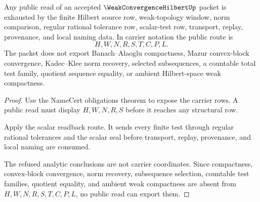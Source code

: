 \begin{theorem}
\label{thm:weak-convergence-hilbert-finite-window-nonescape}
Any public read of an accepted $\WeakConvergenceHilbertUp$ packet is exhausted by the finite Hilbert source row, weak-topology window, norm comparison, regular rational tolerance row, scalar-test row, transport, replay, provenance, and local naming data. In carrier notation the public route is
$$
H,W,N,R,S,T,C,P,L .
$$
The packet does not export Banach--Alaoglu compactness, Mazur convex-block convergence, Kadec--Klee norm recovery, selected subsequences, a countable total test family, quotient sequence equality, or ambient Hilbert-space weak compactness.
\end{theorem}
\begin{proof}
Use the NameCert obligations theorem to expose the carrier rows. A public read must display $H,W,N,R,S$ before it reaches any structural row.

Apply the scalar readback route. It sends every finite test through regular rational tolerances and the scalar seal before transport, replay, provenance, and local naming are consumed.

The refused analytic conclusions are not carrier coordinates. Since compactness, convex-block convergence, norm recovery, subsequence selection, countable test families, quotient equality, and ambient weak compactness are absent from $H,W,N,R,S,T,C,P,L$, no public read can export them.
\end{proof}




